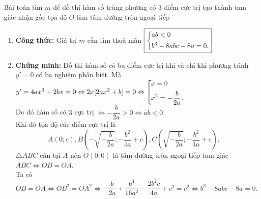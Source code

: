 \begin{dang}{Bài toán tìm $m$ để đồ thị hàm số trùng phương có $3$ điểm cực trị tạo thành tam giác nhận gốc tọa độ $O$ làm tâm đường tròn ngoại tiếp}
	\begin{enumerate}[$\bullet$]
		\item \textbf{Công thức:} Giá trị $m$ cần tìm thoả mãn $\boxed{\left\{\begin{aligned}&ab<0 \\&b^3-8abc-8a=0.\end{aligned}\right.}$
		\item \textbf{Chứng minh:}
		Đồ thị hàm số có ba điểm cực trị khi và chỉ khi phương trình $y'=0$ có ba nghiệm phân biệt.
		Mà $y'=4ax^3+2bx=0\Leftrightarrow 2x[2ax^2+b]=0\Leftrightarrow\left[\begin{aligned}&x= 0\\&x^2=-\dfrac{b}{2a}.\end{aligned}\right.$\\
		Do đó hàm số có $3$ cực trị $\Leftrightarrow -\dfrac{b}{2a}>0 \Leftrightarrow ab<0$.\\
		Khi đó tọa độ các điểm cực trị là $$A(0;c), B\left(-\sqrt{-\dfrac{b}{2a}};-\dfrac{b^2}{4a}+c\right), C\left(\sqrt{-\dfrac{b}{2a}};-\dfrac{b^2}{4a}+c\right).$$
		$\triangle ABC$ cân tại $A$ nên $O(0;0)$ là tâm đường tròn ngoại tiếp tam giác $ABC\Leftrightarrow OB=OA$.\\
		Ta có
		$$OB=OA \Leftrightarrow OB^2=OA^2 \Leftrightarrow-\dfrac{b}{2a}+\dfrac{b^4}{16a^2}-\dfrac{2b^2c}{4a}+c^2=c^2
		\Leftrightarrow b^3-8abc-8a=0.$$
	\end{enumerate}
\end{dang}
